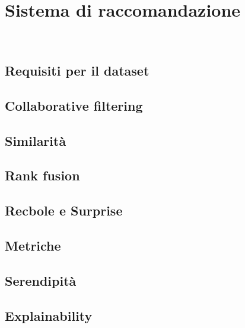 \chapter{Sistema di raccomandazione}
\label{cap:sistema-raccomandazione}

\\

\section{Requisiti per il dataset}

\section{Collaborative filtering}

\section{Similarità}

\section{Rank fusion}

\section{Recbole e Surprise}

\section{Metriche}

\section{Serendipità}

\section{Explainability}
